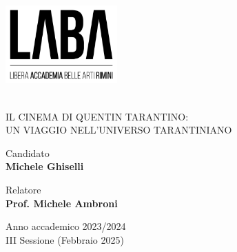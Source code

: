 \documentclass[12pt]{article} %
\begin{document}
\begin{titlepage}
    \begin{spacing}{0.8}
    \begin{center}
        \includegraphics[height=3cm]{labalogo.png}
        \vspace*{1cm}


        \vspace*{2cm}
        
        \\\vspace{0.5cm}
        \large
        IL CINEMA DI QUENTIN TARANTINO:\\ UN VIAGGIO NELL'UNIVERSO TARANTINIANO

        \normalsize
        \vspace*{4cm}

        \begin{minipage}[t]{0.47\textwidth}
	       {Candidato} \vspace{0.3em} \\
              {\large \textbf{Michele Ghiselli}} \vspace{1em}  \\
        \end{minipage}
        \hfill
        \begin{minipage}[t]{0.47\textwidth}\raggedleft
	       {Relatore} \hspace{-0.9em} \vspace{0.3em} \\
              {\large \textbf{Prof. Michele Ambroni}} %
        \end{minipage}

        \vfill
        Anno accademico 2023/2024\\
        III Sessione (Febbraio 2025)
    \end{center}
    \end{spacing}
\end{titlepage}
\end{document}
